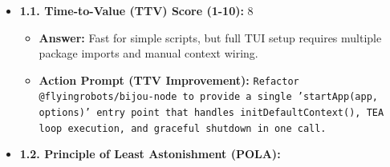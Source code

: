 \begin{itemize}
\tightlist
\item
  \textbf{1.1. Time-to-Value (TTV) Score (1-10):} 8

  \begin{itemize}
  \tightlist
  \item
    \textbf{Answer:} Fast for simple scripts, but full TUI setup requires multiple package imports and manual context wiring.
  \item
    \textbf{Action Prompt (TTV Improvement):} \texttt{R\allowbreak{}e\allowbreak{}f\allowbreak{}a\allowbreak{}c\allowbreak{}t\allowbreak{}o\allowbreak{}r\allowbreak{} \allowbreak{}@\allowbreak{}f\allowbreak{}l\allowbreak{}y\allowbreak{}i\allowbreak{}n\allowbreak{}g\allowbreak{}r\allowbreak{}o\allowbreak{}b\allowbreak{}o\allowbreak{}t\allowbreak{}s\allowbreak{}/\allowbreak{}b\allowbreak{}i\allowbreak{}j\allowbreak{}o\allowbreak{}u\allowbreak{}-\allowbreak{}n\allowbreak{}o\allowbreak{}d\allowbreak{}e\allowbreak{} \allowbreak{}t\allowbreak{}o\allowbreak{} \allowbreak{}p\allowbreak{}r\allowbreak{}o\allowbreak{}v\allowbreak{}i\allowbreak{}d\allowbreak{}e\allowbreak{} \allowbreak{}a\allowbreak{} \allowbreak{}s\allowbreak{}i\allowbreak{}n\allowbreak{}g\allowbreak{}l\allowbreak{}e\allowbreak{} \allowbreak{}'\allowbreak{}s\allowbreak{}t\allowbreak{}a\allowbreak{}r\allowbreak{}t\allowbreak{}A\allowbreak{}p\allowbreak{}p\allowbreak{}(\allowbreak{}a\allowbreak{}p\allowbreak{}p\allowbreak{},\allowbreak{} \allowbreak{}o\allowbreak{}p\allowbreak{}t\allowbreak{}i\allowbreak{}o\allowbreak{}n\allowbreak{}s\allowbreak{})\allowbreak{}'\allowbreak{} \allowbreak{}e\allowbreak{}n\allowbreak{}t\allowbreak{}r\allowbreak{}y\allowbreak{} \allowbreak{}p\allowbreak{}o\allowbreak{}i\allowbreak{}n\allowbreak{}t\allowbreak{} \allowbreak{}t\allowbreak{}h\allowbreak{}a\allowbreak{}t\allowbreak{} \allowbreak{}h\allowbreak{}a\allowbreak{}n\allowbreak{}d\allowbreak{}l\allowbreak{}e\allowbreak{}s\allowbreak{} \allowbreak{}i\allowbreak{}n\allowbreak{}i\allowbreak{}t\allowbreak{}D\allowbreak{}e\allowbreak{}f\allowbreak{}a\allowbreak{}u\allowbreak{}l\allowbreak{}t\allowbreak{}C\allowbreak{}o\allowbreak{}n\allowbreak{}t\allowbreak{}e\allowbreak{}x\allowbreak{}t\allowbreak{}(\allowbreak{})\allowbreak{},\allowbreak{} \allowbreak{}T\allowbreak{}E\allowbreak{}A\allowbreak{} \allowbreak{}l\allowbreak{}o\allowbreak{}o\allowbreak{}p\allowbreak{} \allowbreak{}e\allowbreak{}x\allowbreak{}e\allowbreak{}c\allowbreak{}u\allowbreak{}t\allowbreak{}i\allowbreak{}o\allowbreak{}n\allowbreak{},\allowbreak{} \allowbreak{}a\allowbreak{}n\allowbreak{}d\allowbreak{} \allowbreak{}g\allowbreak{}r\allowbreak{}a\allowbreak{}c\allowbreak{}e\allowbreak{}f\allowbreak{}u\allowbreak{}l\allowbreak{} \allowbreak{}s\allowbreak{}h\allowbreak{}u\allowbreak{}t\allowbreak{}d\allowbreak{}o\allowbreak{}w\allowbreak{}n\allowbreak{} \allowbreak{}i\allowbreak{}n\allowbreak{} \allowbreak{}o\allowbreak{}n\allowbreak{}e\allowbreak{} \allowbreak{}c\allowbreak{}a\allowbreak{}l\allowbreak{}l\allowbreak{}.}
  \end{itemize}
\item
  \textbf{1.2. Principle of Least Astonishment (POLA):}


\end{itemize}
